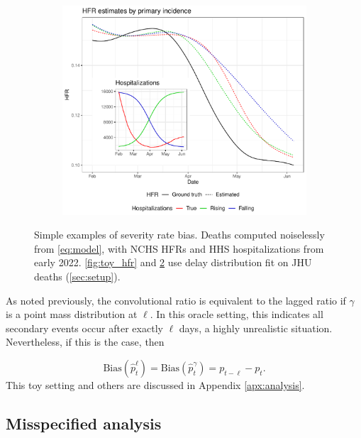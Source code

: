 \documentclass{article}
\begin{document}
\begin{figure}
\begin{subfigure}[b]{0.32\linewidth}
         \caption{}
         \label{fig:toy_delay}
     \end{subfigure}
     \begin{subfigure}[b]{0.32\linewidth}
         \centering
         \includegraphics[width=\linewidth]{Figs/Simulated/toy_chging_primary.pdf}
         \caption{}
         \label{fig:toy_primary}
     \end{subfigure}
        \caption{Simple examples of severity rate bias. Deaths computed noiselessly from \eqref{eq:model}, with NCHS HFRs and HHS hospitalizations from early 2022. \ref{fig:toy_hfr} and \ref{fig:toy_primary} use delay distribution fit on JHU deaths (\ref{sec:setup}).}
        \label{fig:bias_ex_main}
\end{figure}


As noted previously, the convolutional ratio is equivalent to the lagged ratio if $\gamma$ is a point mass distribution at $\ell$. In this oracle setting, this indicates all secondary events occur after exactly $\ell$ days, a highly unrealistic situation. Nevertheless, if this is the case, then 

$$\text{Bias}(\hat{p}_t^\ell) = \text{Bias}(\hat{p}_t^\gamma) = p_{t-\ell}-p_t.$$
\noindent This toy setting and others are discussed in Appendix \ref{apx:analysis}.

\subsection{Misspecified analysis}\label{sec:misp}
\end{document}
